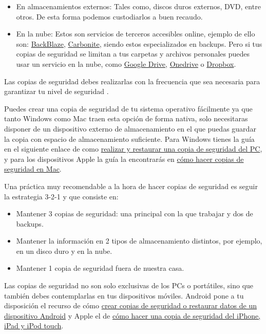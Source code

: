 \documentclass[
  a4paper,
  openany]{book}
\begin{document}
\begin{itemize}
\item
  En almacenamientos externos: Tales como, discos duros externos, DVD, entre otros. De esta forma podemos custodiarlos a buen recaudo.
\item
  En la nube: Estos son servicios de terceros accesibles online, ejemplo de ello son: \href{https://www.backblaze.com/home-1.html}{BackBlaze}, \href{https://www.carbonite.com/}{Carbonite}, siendo estos especializados en backups. Pero si tus copias de seguridad se limitan a tus carpetas y archivos personales puedes usar un servicio en la nube, como \href{https://www.google.com/intl/en_in/drive/}{Google Drive}, \href{https://www.microsoft.com/en-us/microsoft-365/onedrive/online-cloud-storage}{Onedrive} o \href{https://www.dropbox.com/}{Dropbox}.
\end{itemize}

Las copias de seguridad debes realizarlas con la frecuencia que sea necesaria para garantizar tu nivel de seguridad \citep{tipos-copia-seguridad}.

Puedes crear una copia de seguridad de tu sistema operativo fácilmente ya que tanto Windows como Mac traen esta opción de forma nativa, solo necesitaras disponer de un dispositivo externo de almacenamiento en el que puedas guardar la copia con espacio de almacenamiento suficiente. Para Windows tienes la guía en el siguiente enlace de como \href{https://support.microsoft.com/es-es/windows/realizar-y-restaurar-una-copia-de-seguridad-del-pc-ac359b36-7015-4694-de9a-c5eac1ce9d9c}{realizar y restaurar una copia de seguridad del PC}, y para los dispositivos Apple la guía la encontrarás en \href{https://support.apple.com/es-es/mac-backup}{cómo hacer copias de seguridad en Mac}.

Una práctica muy recomendable a la hora de hacer copias de seguridad es seguir la estrategia 3-2-1 \citep{INCI-copia-3-2-1} y que consiste en:

\begin{itemize}
\item
  Mantener 3 copias de seguridad: una principal con la que trabajar y dos de backups.
\item
  Mantener la información en 2 tipos de almacenamiento distintos, por ejemplo, en un disco duro y en la nube.
\item
  Mantener 1 copia de seguridad fuera de nuestra casa.
\end{itemize}

Las copias de seguridad no son solo exclusivas de los PCs o portátiles, sino que también debes contemplarlas en tus dispositivos móviles. Android pone a tu disposición el recurso de cómo \href{https://support.google.com/android/answer/2819582?hl=es\&visit_id=637514255756661953-3969236140\&rd=1}{crear copias de seguridad o restaurar datos de un dispositivo Android} y Apple el de \href{https://support.apple.com/es-es/HT203977}{cómo hacer una copia de seguridad del iPhone, iPad y iPod touch}.
\end{document}
